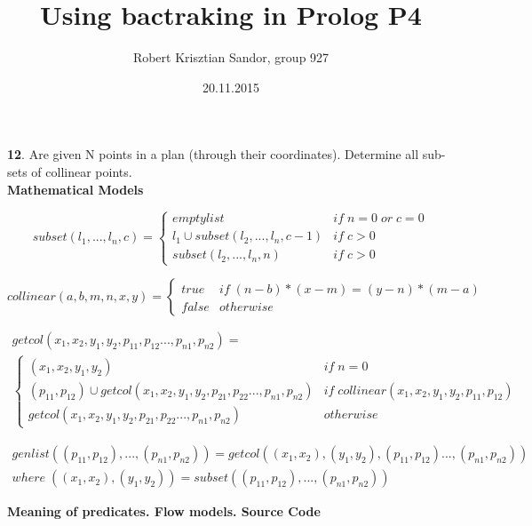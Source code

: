 \documentclass[11pt]{article}
\title{\textbf{Using bactraking in Prolog P4}}
\author{Robert Krisztian Sandor, group 927}
\date{20.11.2015}
\begin{document}
\maketitle

\textbf{12}. Are given N points in a plan (through their coordinates). Determine all sub-sets of collinear points. \\

\textbf{Mathematical Models}

\[
subset(l_1, ..., l_n, c) = 
\left \{
	\begin{array}{ll}
		empty list & if \; n = 0 \; or \; c = 0 \\
		l_1 \cup subset(l_2, ..., l_n, c - 1) & if \; c > 0 \\
		subset(l_2, ..., l_n, n) & if \; c > 0
	\end{array}
\right.
\]

\[
collinear(a, b, m, n, x, y) = 
\left \{
	\begin{array}{ll}
		true & if \; (n-b)*(x-m)=(y-n)*(m-a) \\
		false & otherwise
	\end{array}
\right.
\]

\begin{multline*}
getcol(x_1, x_2, y_1, y_2, p_{11}, p_{12} ..., p_{n1}, p_{n2}) = \\ 
\left \{
	\begin{array}{ll}
		(x_1, x_2, y_1, y_2) & if \; n = 0 \\
		(p_{11}, p_{12}) \cup getcol(x_1, x_2, y_1, y_2, p_{21}, p_{22} ..., p_{n1}, p_{n2}) &
		if \; collinear(x_1, x_2, y_1, y_2, p_{11}, p_{12}) \\
		getcol(x_1, x_2, y_1, y_2, p_{21}, p_{22} ..., p_{n1}, p_{n2}) & otherwise
	\end{array}
\right.
\end{multline*}

\begin{multline*}
genlist((p_{11}, p_{12}), ..., (p_{n1}, p_{n2})) = getcol((x_1, x_2), (y_1, y_2), (p_{11}, p_{12}) ..., (p_{n1}, p_{n2})) \\
where \; ((x_1, x_2), (y_1, y_2)) = subset((p_{11}, p_{12}), ..., (p_{n1}, p_{n2}))
\end{multline*}

\newpage

\textbf{Meaning of predicates. Flow models. Source Code}
\end{document}
